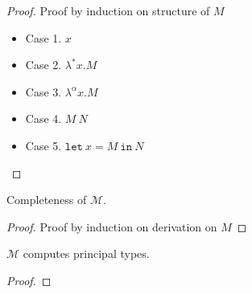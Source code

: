 \begin{proof}
  Proof by induction on structure of $M$
  \begin{itemize}
  \item Case 1. $x$
  \item Case 2. $\lambda^{*} x. M$
  \item Case 3. $\lambda ^{\alpha}x. M$
  \item Case 4. $M\ N$
  \item Case 5. $\texttt{let}\ x = M\ \texttt{in}\ N$
  \end{itemize}

\end{proof}

\begin{theorem}
  Completeness of $\mathcal{M}$.
\end{theorem}
\begin{proof}
  Proof by induction on derivation on $M$
\end{proof}

\begin{theorem}
  $\mathcal{M}$ computes principal types.
\end{theorem}
\begin{proof}

\end{proof}